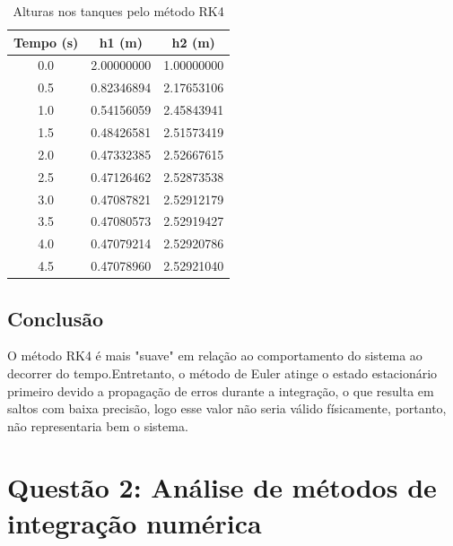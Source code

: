 \documentclass{article}
\begin{document}
\begin{table}[htbp]
    \centering
    \caption{Alturas nos tanques pelo método RK4}\label{tab:resultados_rk4}
    \begin{tabular}{c c c}
        \toprule
        \textbf{Tempo (s)} & \textbf{h1 (m)} & \textbf{h2 (m)} \\
        \midrule
        0.0 & 2.00000000 & 1.00000000 \\
        0.5 & 0.82346894 & 2.17653106 \\
        1.0 & 0.54156059 & 2.45843941 \\
        1.5 & 0.48426581 & 2.51573419 \\
        2.0 & 0.47332385 & 2.52667615 \\
        2.5 & 0.47126462 & 2.52873538 \\
        3.0 & 0.47087821 & 2.52912179 \\
        3.5 & 0.47080573 & 2.52919427 \\
        4.0 & 0.47079214 & 2.52920786 \\
        4.5 & 0.47078960 & 2.52921040 \\
        \bottomrule
    \end{tabular}
\end{table}
\subsection*{Conclusão}
O método RK4 é mais "suave" em relação ao comportamento do sistema ao decorrer do tempo.Entretanto, o método de Euler atinge o estado estacionário primeiro devido a propagação de erros durante a integração, o que resulta em saltos com baixa precisão, logo esse valor não seria válido físicamente, portanto, não representaria bem o sistema.



\section*{Questão 2: Análise de métodos de integração numérica}
\justifying
\end{document}
